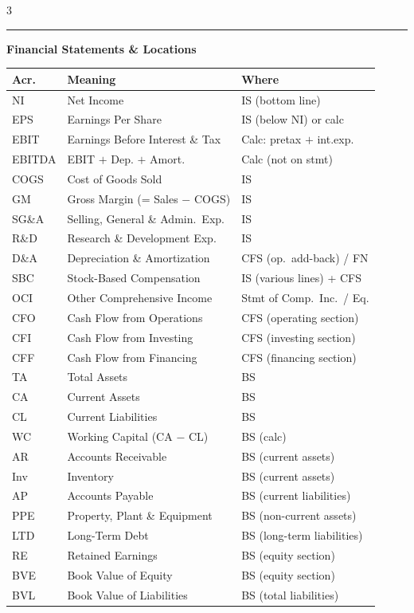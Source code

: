 \documentclass[10pt]{article}
\newcommand{\sect}[1]{%
  \vspace{4pt}\noindent{\footnotesize\bfseries #1}%
  \vspace{0.5pt}\\\rule{\columnwidth}{0.3pt}\vspace{1pt}}
\begin{document}
\begin{multicols}{3}
\sect{Acronym Glossary}
\textbf{Financial Statements \& Locations}\\[1pt]
{\scriptsize\begin{tabular}{@{}l@{\ }l@{\ }l@{}}
\toprule
Acr. & Meaning & Where \\
\midrule
NI   & Net Income & IS (bottom line) \\
EPS  & Earnings Per Share & IS (below NI) or calc \\
EBIT & Earnings Before Interest \& Tax & Calc: pretax $+$ int.exp. \\
EBITDA & EBIT $+$ Dep. $+$ Amort. & Calc (not on stmt) \\
COGS & Cost of Goods Sold & IS \\
GM   & Gross Margin (= Sales $-$ COGS) & IS \\
SG\&A & Selling, General \& Admin.\ Exp. & IS \\
R\&D & Research \& Development Exp. & IS \\
D\&A & Depreciation \& Amortization & CFS (op.\ add-back) / FN \\
SBC  & Stock-Based Compensation & IS (various lines) + CFS \\
OCI  & Other Comprehensive Income & Stmt of Comp.\ Inc.\ / Eq. \\
CFO  & Cash Flow from Operations & CFS (operating section) \\
CFI  & Cash Flow from Investing & CFS (investing section) \\
CFF  & Cash Flow from Financing & CFS (financing section) \\
TA   & Total Assets & BS \\
CA   & Current Assets & BS \\
CL   & Current Liabilities & BS \\
WC   & Working Capital (CA $-$ CL) & BS (calc) \\
AR   & Accounts Receivable & BS (current assets) \\
Inv  & Inventory & BS (current assets) \\
AP   & Accounts Payable & BS (current liabilities) \\
PPE  & Property, Plant \& Equipment & BS (non-current assets) \\
LTD  & Long-Term Debt & BS (long-term liabilities) \\
RE   & Retained Earnings & BS (equity section) \\
BVE  & Book Value of Equity & BS (equity section) \\
BVL  & Book Value of Liabilities & BS (total liabilities) \\

\end{tabular}}
\end{multicols}
\end{document}
